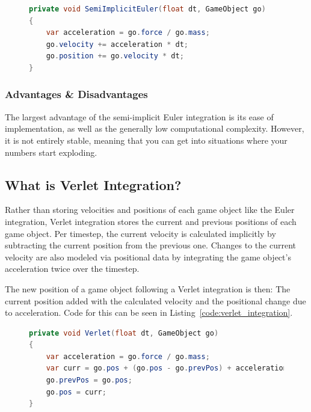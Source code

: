 \begin{figure}
\begin{lstlisting}[label={code:semi-implicit_euler_integration},language=csharp,caption={Semi-Implicit Euler Integration}]
private void SemiImplicitEuler(float dt, GameObject go)
{
    var acceleration = go.force / go.mass;
    go.velocity += acceleration * dt;
    go.position += go.velocity * dt;
}
\end{lstlisting}
\end{figure}

\subsubsection{Advantages \& Disadvantages}
The largest advantage of the semi-implicit Euler integration is its ease of implementation, as well as the generally low computational complexity.
However, it is not entirely stable, meaning that you can get into situations where your numbers start exploding.

\subsection{What is Verlet Integration?}
Rather than storing velocities and positions of each game object like the Euler integration, Verlet integration stores the current and previous positions of each game object.
Per timestep, the current velocity is calculated implicitly by subtracting the current position from the previous one.
Changes to the current velocity are also modeled via positional data by integrating the game object's acceleration twice over the timestep.

The new position of a game object following a Verlet integration is then: The current position added with the calculated velocity and the positional change due to acceleration.
Code for this can be seen in Listing~\ref{code:verlet_integration}.

\begin{figure}
\begin{lstlisting}[label={code:verlet_integration},language=csharp,caption={Verlet Integration}]
private void Verlet(float dt, GameObject go)
{
    var acceleration = go.force / go.mass;
    var curr = go.pos + (go.pos - go.prevPos) + acceleration * dt * dt;
    go.prevPos = go.pos;
    go.pos = curr;
}
\end{lstlisting}
\end{figure}


